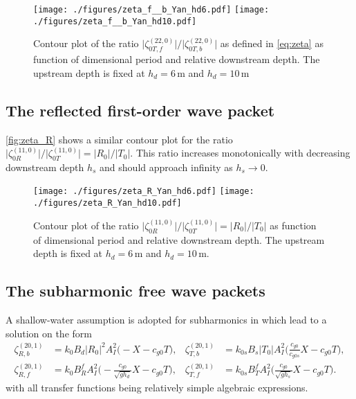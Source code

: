 \documentclass[internal]{sintefmemo}
\begin{document}
\begin{figure}[H]%
\center
\texttt{[image: ./figures/zeta\_f\_\_b\_Yan\_hd6.pdf]}%
\texttt{[image: ./figures/zeta\_f\_\_b\_Yan\_hd10.pdf]}%
\caption{Contour plot of the ratio $\big|\zeta_{0T,f}^{(22,0)}\big|\big/\big|\zeta_{0T,b}^{(22,0)}\big|$ as defined in \eqref{eq:zeta} as function of dimensional period and relative downstream depth.
The upstream depth is fixed at $h_d = 6$\,m and $h_d = 10$\,m}%
\label{fig:zeta_f__b}%
\end{figure}


\subsection{The reflected first-order wave packet}
\autoref{fig:zeta_R} shows a similar contour plot for the ratio $\big|\zeta_{0R}^{(11,0)}\big|\big/\big|\zeta_{0T}^{(11,0)}\big| = |R_{0}|/|T_0|$.
This ratio increases monotonically with decreasing downstream depth $h_s$ and should approach infinity as $h_s\to 0$.

\begin{figure}[h!pbt]%
\center
\texttt{[image: ./figures/zeta\_R\_Yan\_hd6.pdf]}%
\texttt{[image: ./figures/zeta\_R\_Yan\_hd10.pdf]}%
\caption{Contour plot of the ratio $\big|\zeta_{0R}^{(11,0)}\big|\big/\big|\zeta_{0T}^{(11,0)}\big| = |R_{0}|/|T_0|$ as function of dimensional period and relative downstream depth.
The upstream depth is fixed at $h_d = 6$\,m and $h_d = 10$\,m.}%
\label{fig:zeta_R}%
\end{figure}



\subsection{The subharmonic free wave packets}

A shallow-water assumption is adopted for subharmonics in \citet{li_2021_step1} which lead to a solution on the form
\begin{align}
\zeta_{R,b}^{(20,1)} &= k_0 B_d |R_0|^2A_I^2\Bigg(-X-c_{g0}T\Bigg),
&
\zeta_{T,b}^{(20,1)} &= k_{0s} B_s |T_0|A_I^2\Bigg(\frac{c_{g0}}{c_{g0s}}X-c_{g0}T\Bigg),
\\
\zeta_{R,f}^{(20,1)} &= k_0 B_R^f A_I^2\Bigg(-\frac{c_{g0}}{\sqrt{gh_d}}X-c_{g0}T\Bigg),
&
\zeta_{T,f}^{(20,1)} &= k_{0s} B_T^f A_I^2\Bigg(\frac{c_{g0}}{\sqrt{gh_s}}X-c_{g0}T\Bigg).
\end{align}
with all transfer functions being relatively simple algebraic expressions.
\end{document}

